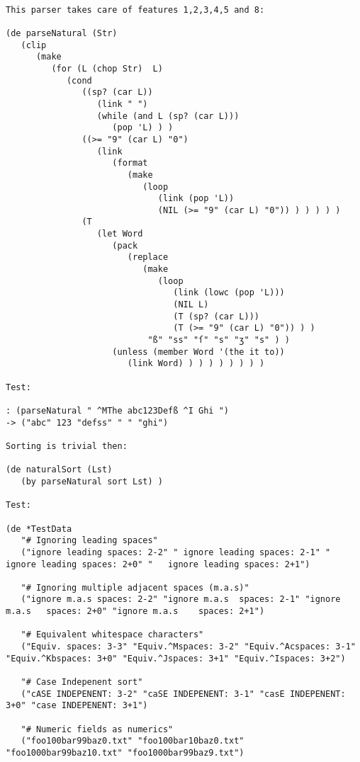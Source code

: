 \begin{verbatim}

This parser takes care of features 1,2,3,4,5 and 8:

(de parseNatural (Str)
   (clip
      (make
         (for (L (chop Str)  L)
            (cond
               ((sp? (car L))
                  (link " ")
                  (while (and L (sp? (car L)))
                     (pop 'L) ) )
               ((>= "9" (car L) "0")
                  (link
                     (format
                        (make
                           (loop
                              (link (pop 'L))
                              (NIL (>= "9" (car L) "0")) ) ) ) ) )
               (T
                  (let Word
                     (pack
                        (replace
                           (make
                              (loop
                                 (link (lowc (pop 'L)))
                                 (NIL L)
                                 (T (sp? (car L)))
                                 (T (>= "9" (car L) "0")) ) )
                            "ß" "ss" "ſ" "s" "ʒ" "s" ) )
                     (unless (member Word '(the it to))
                        (link Word) ) ) ) ) ) ) ) )

Test:

: (parseNatural " ^MThe abc123Defß ^I Ghi ")
-> ("abc" 123 "defss" " " "ghi")

Sorting is trivial then:

(de naturalSort (Lst)
   (by parseNatural sort Lst) )

Test:

(de *TestData
   "# Ignoring leading spaces"
   ("ignore leading spaces: 2-2" " ignore leading spaces: 2-1" "  ignore leading spaces: 2+0" "   ignore leading spaces: 2+1")

   "# Ignoring multiple adjacent spaces (m.a.s)"
   ("ignore m.a.s spaces: 2-2" "ignore m.a.s  spaces: 2-1" "ignore m.a.s   spaces: 2+0" "ignore m.a.s    spaces: 2+1")

   "# Equivalent whitespace characters"
   ("Equiv. spaces: 3-3" "Equiv.^Mspaces: 3-2" "Equiv.^Acspaces: 3-1" "Equiv.^Kbspaces: 3+0" "Equiv.^Jspaces: 3+1" "Equiv.^Ispaces: 3+2")

   "# Case Indepenent sort"
   ("cASE INDEPENENT: 3-2" "caSE INDEPENENT: 3-1" "casE INDEPENENT: 3+0" "case INDEPENENT: 3+1")

   "# Numeric fields as numerics"
   ("foo100bar99baz0.txt" "foo100bar10baz0.txt" "foo1000bar99baz10.txt" "foo1000bar99baz9.txt")


\end{verbatim}
